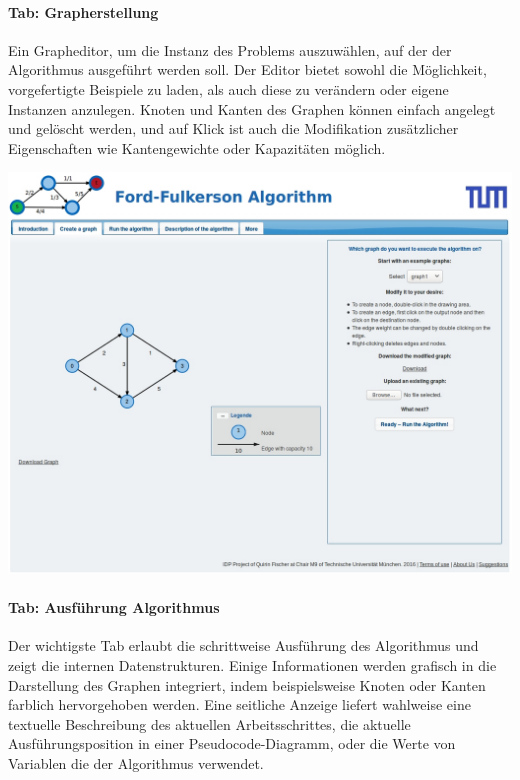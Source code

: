 \paragraph{Tab: Grapherstellung} Ein Grapheditor, um die Instanz des Problems auszuwählen, auf der der Algorithmus ausgeführt werden soll. Der Editor bietet sowohl die Möglichkeit, vorgefertigte Beispiele zu laden, als auch diese zu verändern oder eigene Instanzen anzulegen. Knoten und Kanten des Graphen können einfach angelegt und gelöscht werden, und auf Klick ist auch die Modifikation zusätzlicher Eigenschaften wie Kantengewichte oder Kapazitäten möglich.

\begin{center}
\begin{minipage}[t]{0.60\textwidth}
    \includegraphics[width=\textwidth]{img/layout-2.jpg}
\end{minipage}
\end{center}
\vspace{1cm}

\paragraph{Tab: Ausführung Algorithmus}

Der wichtigste Tab erlaubt die schrittweise Ausführung des Algorithmus und zeigt die internen Datenstrukturen. Einige Informationen werden grafisch in die Darstellung des Graphen integriert, indem beispielsweise Knoten oder Kanten farblich hervorgehoben werden. Eine seitliche Anzeige liefert wahlweise eine textuelle Beschreibung des aktuellen Arbeitsschrittes, die aktuelle Ausführungsposition in einer Pseudocode-Diagramm, oder die Werte von Variablen die der Algorithmus verwendet.

